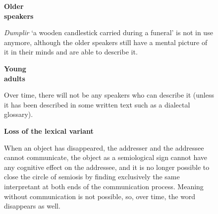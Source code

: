 \begin{subfigure}[t]{0.29\textwidth}
		{\centering
		\vphantom{Loss of the lexical variant}\textbf{Older\\ speakers}\\[1em]
		}
		
		\emph{Dumplir} `a wooden candlestick carried during a funeral' is not in use anymore, although the older speakers still have a mental picture of it in their minds and are able to describe it.
	\end{subfigure}%
	\hspace{.05\textwidth}%
	\begin{subfigure}[t]{0.29\textwidth}
		{\centering
		\vphantom{Loss of the lexical variant}\textbf{Young\\ adults}\\[1em]
		}
		
		Over time, there will not be any speakers who can describe it (unless it has been described in some written text such as a dialectal glossary).
	\end{subfigure}%
	\hspace{.05\textwidth}%
	\begin{subfigure}[t]{0.29\textwidth}
		{\centering
		\vphantom{Loss of the lexical variant}\textbf{Loss of the lexical variant}\\[1em]
		}
		
		When an object has disappeared, the addresser and the addressee cannot communicate, the object as a semiological sign cannot have any cognitive effect on the addressee, and it is no longer possible to close the circle of semiosis by  finding exclusively the same interpretant at both ends of the communication process.
		Meaning without communication is not possible, so, over time, the word disappears as well.
	\end{subfigure}%